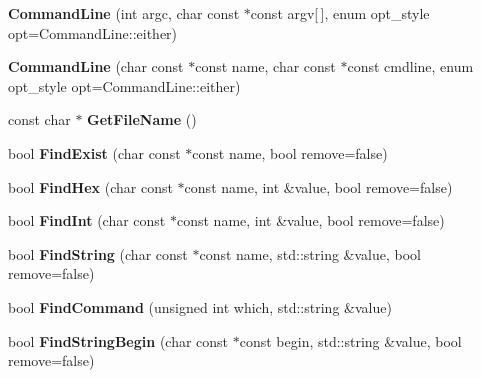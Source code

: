 \begin{DoxyCompactItemize}
\item 
\hypertarget{classCommandLine_a564a8d1913e306decc89493674b3198e}{{\bfseries Command\-Line} (int argc, char const $\ast$const argv\mbox{[}$\,$\mbox{]}, enum opt\-\_\-style opt=Command\-Line\-::either)}\label{classCommandLine_a564a8d1913e306decc89493674b3198e}

\item 
\hypertarget{classCommandLine_a6f1b87cd2fd1823d0166c98a954872ae}{{\bfseries Command\-Line} (char const $\ast$const name, char const $\ast$const cmdline, enum opt\-\_\-style opt=Command\-Line\-::either)}\label{classCommandLine_a6f1b87cd2fd1823d0166c98a954872ae}

\item 
\hypertarget{classCommandLine_a1f45b4326873dbcd8e1f3a37293390e1}{const char $\ast$ {\bfseries Get\-File\-Name} ()}\label{classCommandLine_a1f45b4326873dbcd8e1f3a37293390e1}

\item 
\hypertarget{classCommandLine_afb34ecd52f6c897051767042bcca5918}{bool {\bfseries Find\-Exist} (char const $\ast$const name, bool remove=false)}\label{classCommandLine_afb34ecd52f6c897051767042bcca5918}

\item 
\hypertarget{classCommandLine_ac3fd4a68a14b29f1a23e9a828d6a0683}{bool {\bfseries Find\-Hex} (char const $\ast$const name, int \&value, bool remove=false)}\label{classCommandLine_ac3fd4a68a14b29f1a23e9a828d6a0683}

\item 
\hypertarget{classCommandLine_a8179a05544caa1ac6170f5a79f0a1d99}{bool {\bfseries Find\-Int} (char const $\ast$const name, int \&value, bool remove=false)}\label{classCommandLine_a8179a05544caa1ac6170f5a79f0a1d99}

\item 
\hypertarget{classCommandLine_a1fe7d738d6388a60e04c8479312743ef}{bool {\bfseries Find\-String} (char const $\ast$const name, std\-::string \&value, bool remove=false)}\label{classCommandLine_a1fe7d738d6388a60e04c8479312743ef}

\item 
\hypertarget{classCommandLine_a68fc2c8be26d62d89f29dafb7fba5799}{bool {\bfseries Find\-Command} (unsigned int which, std\-::string \&value)}\label{classCommandLine_a68fc2c8be26d62d89f29dafb7fba5799}

\item 
\hypertarget{classCommandLine_a372efd83a11653150c7e05be677dbcae}{bool {\bfseries Find\-String\-Begin} (char const $\ast$const begin, std\-::string \&value, bool remove=false)}\label{classCommandLine_a372efd83a11653150c7e05be677dbcae}


\end{DoxyCompactItemize}
